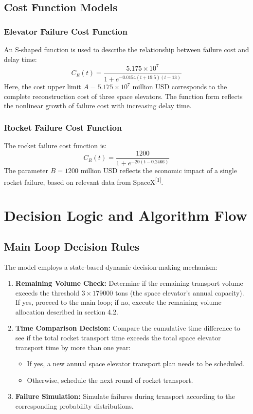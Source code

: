\documentclass{article}
\begin{document}
\subsection{Cost Function Models}
\subsubsection{Elevator Failure Cost Function}
An S-shaped function is used to describe the relationship between failure cost and delay time:
\[
C_{E}(t) = \frac{5.175 \times 10^{7}}{1 + e^{- 0.0154(t + 19.5)(t - 13)}}
\]
Here, the cost upper limit $A = 5.175 \times 10^7$ million USD corresponds to the complete reconstruction cost of three space elevators. The function form reflects the nonlinear growth of failure cost with increasing delay time.

\subsubsection{Rocket Failure Cost Function}
The rocket failure cost function is:
\[
C_{R}(t) = \frac{1200}{1 + e^{- 20(t - 0.2466)}}
\]
The parameter $B = 1200$ million USD reflects the economic impact of a single rocket failure, based on relevant data from SpaceX\textsuperscript{[1]}.

\section{Decision Logic and Algorithm Flow}
\subsection{Main Loop Decision Rules}
The model employs a state-based dynamic decision-making mechanism:
\begin{enumerate}
    \item \textbf{Remaining Volume Check:} Determine if the remaining transport volume exceeds the threshold $3 \times 179000$ tons (the space elevator's annual capacity). If yes, proceed to the main loop; if no, execute the remaining volume allocation described in section 4.2.
    \item \textbf{Time Comparison Decision:} Compare the cumulative time difference to see if the total rocket transport time exceeds the total space elevator transport time by more than one year:
    \begin{itemize}
        \item If yes, a new annual space elevator transport plan needs to be scheduled.
        \item Otherwise, schedule the next round of rocket transport.
    \end{itemize}
    \item \textbf{Failure Simulation:} Simulate failures during transport according to the corresponding probability distributions.
\end{enumerate}
\end{document}
